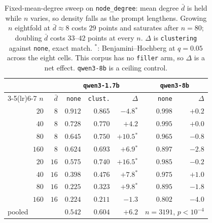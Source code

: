 \begin{table}[t]\centering\small
\setlength{\tabcolsep}{3.5pt}
\begin{tabular}{rrrrrrr}
\toprule
& & \multicolumn{3}{c}{\texttt{qwen3-1.7b}} & \multicolumn{2}{c}{\texttt{qwen3-8b}} \\
\cmidrule(lr){3-5}\cmidrule(lr){6-7}
$n$ & $\bar{d}$ & \texttt{none} & \texttt{clust.} & $\Delta$ & \texttt{none} & $\Delta$ \\
\midrule
$20$ & $8$ & $0.912$ & $0.865$ & $-4.8$$^{*}$ & $0.998$ & $+0.2$ \\
$40$ & $8$ & $0.728$ & $0.770$ & $+4.2$ & $0.995$ & $+0.0$ \\
$80$ & $8$ & $0.645$ & $0.750$ & $+10.5$$^{*}$ & $0.965$ & $-0.8$ \\
$160$ & $8$ & $0.624$ & $0.693$ & $+6.9$$^{*}$ & $0.897$ & $-2.8$ \\
$20$ & $16$ & $0.575$ & $0.740$ & $+16.5$$^{*}$ & $0.985$ & $-0.2$ \\
$40$ & $16$ & $0.398$ & $0.476$ & $+7.8$$^{*}$ & $0.975$ & $+1.0$ \\
$80$ & $16$ & $0.225$ & $0.323$ & $+9.8$$^{*}$ & $0.895$ & $-1.8$ \\
$160$ & $16$ & $0.224$ & $0.211$ & $-1.3$ & $0.802$ & $-4.0$ \\
\midrule
\multicolumn{2}{l}{pooled} & $0.542$ & $0.604$ & $\mathbf{+6.2}$ & \multicolumn{2}{c}{$n{=}3191$, $p{<}10^{-4}$} \\
\bottomrule
\end{tabular}
\caption{Fixed-mean-degree sweep on \texttt{node\_degree}: mean degree $\bar{d}$ is held while $n$ varies, so density falls as the prompt lengthens. Growing $n$ eightfold at $\bar{d}{\approx}8$ costs $29$ points and saturates after $n{=}80$; doubling $\bar{d}$ costs $33$--$42$ points at every $n$. $\Delta$ is \texttt{clustering} against \texttt{none}, exact match. $^{*}$: Benjamini--Hochberg at $q{=}0.05$ across the eight cells. This corpus has no \texttt{filler} arm, so $\Delta$ is a net effect. \texttt{qwen3-8b} is a ceiling control.}
\label{tab:degfixdeg}
\end{table}
